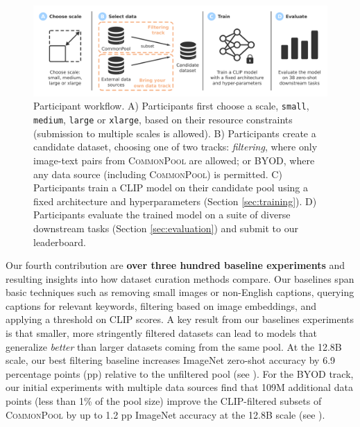 \documentclass[dvipsnames,11pt]{article}
\newcommand{\byod}{\textsc{BYOD}\xspace}
\newcommand{\pool}{\textsc{CommonPool}\xspace}
\begin{document}
\begin{figure}[h!]
    \centering
    \includegraphics[width=\textwidth]{figures/workflow.pdf}
    \caption{Participant workflow. A) Participants first choose a scale, {\small \texttt{small}}, {\small \texttt{medium}}, {\small \texttt{large}} or {\small \texttt{xlarge}}, based on their resource constraints (submission to multiple scales is allowed). B) Participants create a candidate dataset, choosing one of two tracks: \textit{filtering}, where only  image-text pairs from \pool are allowed; or \byod, where any data source (including \pool) is permitted. C) Participants train a CLIP model on their candidate pool using a fixed architecture and hyperparameters (Section \ref{sec:training}). D) Participants evaluate the trained model on a suite of diverse downstream tasks (Section \ref{sec:evaluation}) and submit to our leaderboard.}
    \label{fig:workflow}
\end{figure}


Our fourth contribution are \textbf{over three hundred baseline experiments} and resulting insights into how dataset curation methods compare.
Our baselines span basic techniques such as removing small images or non-English captions, querying captions for relevant keywords, filtering based on image embeddings, and applying a threshold on CLIP scores.
A key result from our baselines experiments is that smaller, more stringently filtered datasets can lead to models that generalize \emph{better} than larger datasets coming from the same pool.
At the 12.8B scale, our best filtering baseline increases ImageNet zero-shot accuracy by 6.9 percentage points (pp) relative to the unfiltered pool (see ).
For the \byod track, our initial experiments with multiple data sources find that 109M additional data points (less than 1\% of the pool size) improve the CLIP-filtered subsets of \pool by up to 1.2 pp ImageNet accuracy at the 12.8B scale (see ). 
\end{document}
